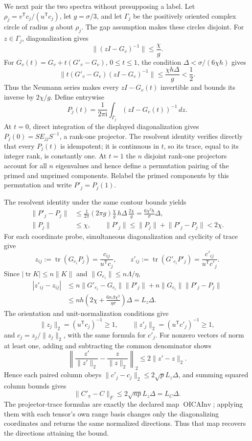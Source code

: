 We next pair the two spectra without presupposing a label. Let \(\rho_j=v^{\mathsf T}c_j/(u^{\mathsf T}c_j)\), let \(g=\sigma/3\), and let \(\Gamma_j\) be the positively oriented complex circle of radius \(g\) about \(\rho_j\). The gap assumption makes these circles disjoint. For \(z\in\Gamma_j\), diagonalization gives
\[
 \lVert(zI-G_v)^{-1}\rVert\le\frac{\chi}{g}.
\]
For \(G_v(t)=G_v+t(G'_v-G_v)\), \(0\le t\le1\), the condition \(\Delta<\sigma/(6\chi h)\) gives
\[
 \lVert t(G'_v-G_v)(zI-G_v)^{-1}\rVert
 \le \frac{\chi h\Delta}{g}<\frac12.
\]
Thus the Neumann series makes every \(zI-G_v(t)\) invertible and bounds its inverse by \(2\chi/g\). Define entrywise
\[
 P_j(t)=\frac{1}{2\pi\mathrm i}\int_{\Gamma_j}(zI-G_v(t))^{-1}\,dz.
\]
At \(t=0\), direct integration of the displayed diagonalization gives \(P_j(0)=SE_{jj}S^{-1}\), a rank-one projector. The resolvent identity verifies directly that every \(P_j(t)\) is idempotent; it is continuous in \(t\), so its trace, equal to its integer rank, is constantly one. At \(t=1\) the \(n\) disjoint rank-one projectors account for all \(n\) eigenvalues and hence define a permutation pairing of the primed and unprimed components. Relabel the primed components by this permutation and write \(P'_j=P_j(1)\).

The resolvent identity under the same contour bounds yields
\[
 \begin{aligned}
 \lVert P'_j-P_j\rVert
 &\le \frac{1}{2\pi}(2\pi g)
 \frac{\chi}{g}\,h\Delta\,\frac{2\chi}{g}
 =\frac{6\chi^2h}{\sigma}\Delta,\\
 \lVert P_j\rVert&\le\chi,
 \qquad
 \lVert P'_j\rVert\le\lVert P_j\rVert+\lVert P'_j-P_j\rVert<2\chi.
 \end{aligned}
\]
For each coordinate probe, simultaneous diagonalization and cyclicity of trace give
\[
 z_{ij}:=\operatorname{tr}(G_{e_i}P_j)=\frac{c_{ij}}{u^{\mathsf T}c_j},
 \qquad
 z'_{ij}:=\operatorname{tr}(G'_{e_i}P'_j)=\frac{c'_{ij}}{u^{\mathsf T}c'_j}.
\]
Since \(|\operatorname{tr}K|\le n\lVert K\rVert\) and \(\lVert G_{e_i}\rVert\le n\Lambda/\eta\),
\[
 \begin{aligned}
 |z'_{ij}-z_{ij}|
 &\le n\lVert G'_{e_i}-G_{e_i}\rVert\lVert P'_j\rVert
 +n\lVert G_{e_i}\rVert\lVert P'_j-P_j\rVert\\
 &\le nh\left(2\chi+\frac{6n\Lambda\chi^2}{\eta\sigma}\right)\Delta
 =L_z\Delta.
 \end{aligned}
\]
The orientation and unit-normalization conditions give
\[
 \lVert z_j\rVert_2=(u^{\mathsf T}c_j)^{-1}\ge1,
 \qquad
 \lVert z'_j\rVert_2=(u^{\mathsf T}c'_j)^{-1}\ge1,
\]
and \(c_j=z_j/\lVert z_j\rVert_2\), with the same formula for \(c'_j\). For nonzero vectors of norm at least one, adding and subtracting the common denominator shows
\[
 \left\lVert\frac{z'}{\lVert z'\rVert_2}-\frac{z}{\lVert z\rVert_2}\right\rVert_2
 \le2\lVert z'-z\rVert_2.
\]
Hence each paired column obeys \(\lVert c'_j-c_j\rVert_2\le2\sqrt p L_z\Delta\), and summing squared column bounds gives
\[
 \lVert C'_{\pi}-C\rVert_F
 \le2\sqrt{np}L_z\Delta=L_C\Delta.
\]
The projector-trace formulas are exactly the declared map \(\operatorname{OICAInv}\); applying them with each tensor's own range basis changes only the diagonalizing coordinates and returns the same normalized directions. Thus that map recovers the directions attaining the bound.